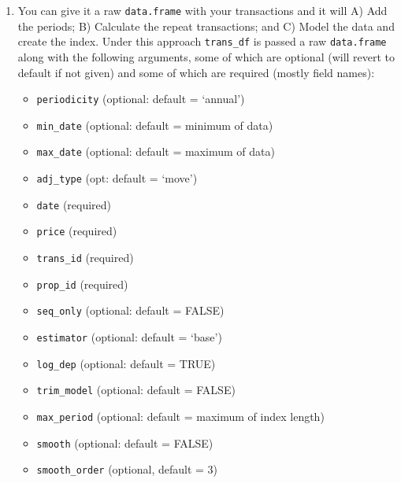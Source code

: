 \documentclass[]{article}
\providecommand{\tightlist}{%
  \setlength{\itemsep}{0pt}\setlength{\parskip}{0pt}}
\begin{document}
\begin{enumerate}
\def\labelenumi{\arabic{enumi}.}
\item
  You can give it a raw \texttt{data.frame} with your transactions and
  it will A) Add the periods; B) Calculate the repeat transactions; and
  C) Model the data and create the index. Under this approach
  \texttt{trans\_df} is passed a raw \texttt{data.frame} along with the
  following arguments, some of which are optional (will revert to
  default if not given) and some of which are required (mostly field
  names):

  \begin{itemize}
  \tightlist
  \item
    \texttt{periodicity} (optional: default = `annual')
  \item
    \texttt{min\_date} (optional: default = minimum of data)
  \item
    \texttt{max\_date} (optional: default = maximum of data)
  \item
    \texttt{adj\_type} (opt: default = `move')
  \item
    \texttt{date} (required)
  \item
    \texttt{price} (required)
  \item
    \texttt{trans\_id} (required)
  \item
    \texttt{prop\_id} (required)
  \item
    \texttt{seq\_only} (optional: default = FALSE)
  \item
    \texttt{estimator} (optional: default = `base')
  \item
    \texttt{log\_dep} (optional: default = TRUE)
  \item
    \texttt{trim\_model} (optional: default = FALSE)
  \item
    \texttt{max\_period} (optional: default = maximum of index length)
  \item
    \texttt{smooth} (optional: default = FALSE)
  \item
    \texttt{smooth\_order} (optional, default = 3)
  \end{itemize}
\end{enumerate}
\end{document}
